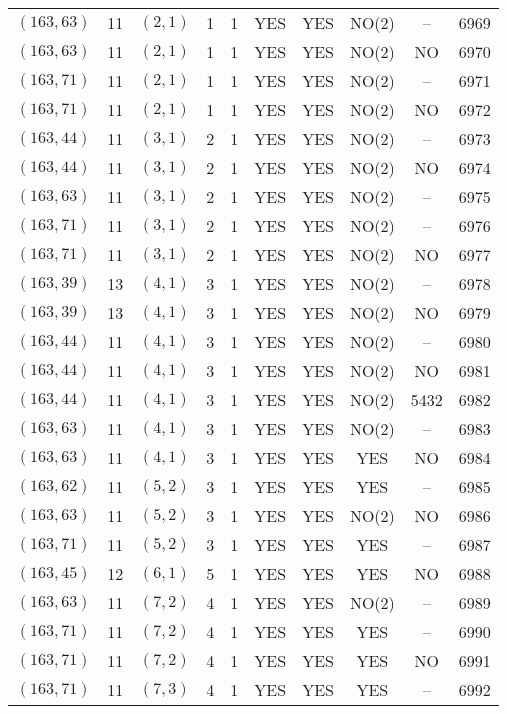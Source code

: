 \begin{longtable}{|c|c|c|c|c|c|c|c|c|c|}
$(163, 63)$ & 11 & $(2, 1)$ & 1 & 1 & YES & YES & NO(2) & -- & 6969\\
$(163, 63)$ & 11 & $(2, 1)$ & 1 & 1 & YES & YES & NO(2) & NO & 6970\\
$(163, 71)$ & 11 & $(2, 1)$ & 1 & 1 & YES & YES & NO(2) & -- & 6971\\
$(163, 71)$ & 11 & $(2, 1)$ & 1 & 1 & YES & YES & NO(2) & NO & 6972\\
$(163, 44)$ & 11 & $(3, 1)$ & 2 & 1 & YES & YES & NO(2) & -- & 6973\\
$(163, 44)$ & 11 & $(3, 1)$ & 2 & 1 & YES & YES & NO(2) & NO & 6974\\
$(163, 63)$ & 11 & $(3, 1)$ & 2 & 1 & YES & YES & NO(2) & -- & 6975\\
$(163, 71)$ & 11 & $(3, 1)$ & 2 & 1 & YES & YES & NO(2) & -- & 6976\\
$(163, 71)$ & 11 & $(3, 1)$ & 2 & 1 & YES & YES & NO(2) & NO & 6977\\
$(163, 39)$ & 13 & $(4, 1)$ & 3 & 1 & YES & YES & NO(2) & -- & 6978\\
$(163, 39)$ & 13 & $(4, 1)$ & 3 & 1 & YES & YES & NO(2) & NO & 6979\\
$(163, 44)$ & 11 & $(4, 1)$ & 3 & 1 & YES & YES & NO(2) & -- & 6980\\
$(163, 44)$ & 11 & $(4, 1)$ & 3 & 1 & YES & YES & NO(2) & NO & 6981\\
$(163, 44)$ & 11 & $(4, 1)$ & 3 & 1 & YES & YES & NO(2) & 5432 & 6982\\
$(163, 63)$ & 11 & $(4, 1)$ & 3 & 1 & YES & YES & NO(2) & -- & 6983\\
$(163, 63)$ & 11 & $(4, 1)$ & 3 & 1 & YES & YES & YES & NO & 6984\\
$(163, 62)$ & 11 & $(5, 2)$ & 3 & 1 & YES & YES & YES & -- & 6985\\
$(163, 63)$ & 11 & $(5, 2)$ & 3 & 1 & YES & YES & NO(2) & NO & 6986\\
$(163, 71)$ & 11 & $(5, 2)$ & 3 & 1 & YES & YES & YES & -- & 6987\\
$(163, 45)$ & 12 & $(6, 1)$ & 5 & 1 & YES & YES & YES & NO & 6988\\
$(163, 63)$ & 11 & $(7, 2)$ & 4 & 1 & YES & YES & NO(2) & -- & 6989\\
$(163, 71)$ & 11 & $(7, 2)$ & 4 & 1 & YES & YES & YES & -- & 6990\\
$(163, 71)$ & 11 & $(7, 2)$ & 4 & 1 & YES & YES & YES & NO & 6991\\
$(163, 71)$ & 11 & $(7, 3)$ & 4 & 1 & YES & YES & YES & -- & 6992\\

\end{longtable}
